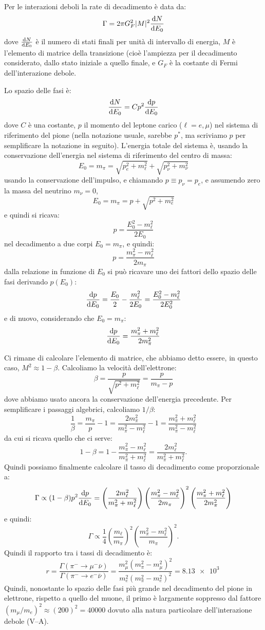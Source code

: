 \begin{Answer}
  Per le interazioni deboli la rate di decadimento \`e data da:
  \[
  \Gamma = 2\pi G_F^2\vert M \vert^2\dv{N}{E_0}
  \]
  dove $\dv{N}{E_0}$ \`e il numero di stati finali per unit\`a di
  intervallo di energia, $M$ \`e l'elemento di matrice della
  transizione (cio\`e l'ampiezza per il decadimento considerato, dallo
  stato iniziale a quello finale, e $G_F$ \`e la costante di Fermi
  dell'interazione debole.

  Lo spazio delle fasi \`e:
  \[
  \dv{N}{E_0} = C p^2 \dv{p}{E_0}
  \]
  dove $C$ \`e una costante, $p$ il momento del leptone carico
  ($\ell=e,\mu$) nel sistema di riferimento del pione (nella notazione
  usuale, sarebbe $p^*$, ma scriviamo $p$ per semplificare la
  notazione in seguito).  L'energia totale del sistema \`e, usando la
  conservazione dell'energia nel sistema di riferimento del centro di
  massa:
  \[
  E_0 = m_\pi = \sqrt{p_e^2 +m_\ell^2} + \sqrt{p_\nu^2+m^2_\nu}
  \]
  usando la conservazione dell'impulso, e chiamando $p \equiv
  p_\nu=p_e$, e assumendo zero la massa del neutrino $m_\nu=0$,
  \[
  E_0 = m_\pi = p + \sqrt{p^2+m^2_e}
  \]
  e quindi si ricava:
  \[
  p = \frac{E_0^2-m_\ell^2}{2E_0}
  \]
  nel decadimento a due corpi $E_0=m_\pi$, e quindi:
  \[
  p = \frac{m_\pi^2-m_\ell^2}{2m_\pi}
  \]
  dalla relazione in funzione di $E_0$ si pu\`o ricavare uno dei fattori dello spazio delle fasi derivando $p(E_0)$:
  \[
  \dv{p}{E_0} = \frac{E_0}{2} - \frac{m_\ell^2}{2E_0} = \frac{E_0^2-m_\ell^2}{2E_0^2}
  \]
  e di nuovo, considerando che $E_0=m_\pi$:
  \[
  \dv{p}{E_0} = \frac{m_\pi^2+m_\ell^2}{2m_\pi^2}
  \]

  Ci rimane di calcolare l'elemento di matrice, che abbiamo detto essere, in questo caso, $M^2 \approx 1-\beta$.
  Calcoliamo la velocit\`a dell'elettrone:
  \[
  \beta = \frac{p}{\sqrt{p^2+m_\ell^2}} = \frac{p}{m_\pi-p}
  \]
  dove abbiamo usato ancora la conservazione dell'energia precedente. Per semplificare i passaggi algebrici, calcoliamo $1/\beta$:
  \[
  \frac{1}{\beta} = \frac{m_\pi}{p}-1 = \frac{2m_\pi^2}{m_\pi^2-m_\ell^2} - 1 = \frac{m_\pi^2+m_\ell^2}{m_\pi^2-m_\ell^2}
  \]
  da cui si ricava quello che ci serve:
  \[
  1-\beta = 1-\frac{m_\pi^2-m_\ell^2}{m_\pi^2+m_\ell^2}  = \frac{2m_\ell^2}{m_\pi^2+m_\ell^2}.
  \]
  Quindi possiamo finalmente calcolare il tasso di decadimento come proporzionale a:
  \[
  \Gamma \propto (1-\beta)p^2\dv{p}{E_0} = \left(\frac{2m_\ell^2}{m_\pi^2+m_\ell^2}\right) \left( \frac{m_\pi^2-m_\ell^2}{2m_\pi} \right)^2 \left( \frac{m_\pi^2+m_\ell^2}{2m_\pi^2} \right)
  \]
  e quindi:
  \[
  \Gamma \propto \frac{1}{4}\left(\frac{m_\ell}{m_\pi}\right)^2  \left( \frac{m_\pi^2-m_\ell^2}{m_\pi} \right)^2.
  \]
  Quindi il rapporto tra i tassi di decadimento \`e:
  \[
  r = \frac{\Gamma(\pi^- \to \mu^-\bar \nu)}{\Gamma(\pi^- \to e^-\bar \nu)} = \frac{m_\mu^2(m_\pi^2-m_\mu^2)^2}{m_e^2(m_\pi^2-m_e^2)^2} = \SI{8.13e3}{}
  \]
  Quindi, nonostante lo spazio delle fasi pi\`u grande nel decadimento
  del pione in elettrone, rispetto a quello del muone, il primo \`e
  largamente soppresso dal fattore $(m_\mu/m_e)^2 \approx (200)^2 = 40000$
  dovuto alla natura particolare dell'interazione debole
  (V--A).
\end{Answer}

